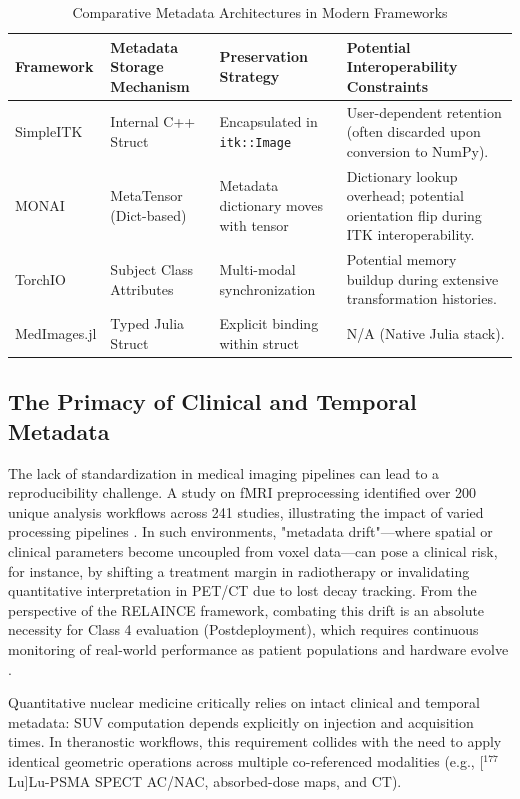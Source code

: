 \documentclass[10pt,letterpaper]{article}
\begin{document}
\begin{table}[H]
\centering
\caption{Comparative Metadata Architectures in Modern Frameworks}
\begin{tabular}{|p{2.5cm}|p{3.5cm}|p{3.5cm}|p{3.5cm}|}
\hline
\textbf{Framework} & \textbf{Metadata Storage Mechanism} & \textbf{Preservation Strategy} & \textbf{Potential Interoperability Constraints} \\
\hline
SimpleITK & Internal C++ Struct & Encapsulated in \texttt{itk::Image} & User-dependent retention (often discarded upon conversion to NumPy). \\
\hline
MONAI & MetaTensor (Dict-based) & Metadata dictionary moves with tensor & Dictionary lookup overhead; potential orientation flip during ITK interoperability. \\
\hline
TorchIO & Subject Class Attributes & Multi-modal synchronization & Potential memory buildup during extensive transformation histories. \\
\hline
MedImages.jl & Typed Julia Struct & Explicit binding within struct & N/A (Native Julia stack). \\
\hline
\end{tabular}
\label{tab:metadata_comparison}
\end{table}

\subsection*{The Primacy of Clinical and Temporal Metadata}
The lack of standardization in medical imaging pipelines can lead to a reproducibility challenge. A study on fMRI preprocessing identified over 200 unique analysis workflows across 241 studies, illustrating the impact of varied processing pipelines \cite{Esteban_2018}. In such environments, "metadata drift"---where spatial or clinical parameters become uncoupled from voxel data---can pose a clinical risk, for instance, by shifting a treatment margin in radiotherapy or invalidating quantitative interpretation in PET/CT due to lost decay tracking. From the perspective of the RELAINCE framework, combating this drift is an absolute necessity for Class 4 evaluation (Postdeployment), which requires continuous monitoring of real-world performance as patient populations and hardware evolve \cite{JhaBradshaw2022}.

Quantitative nuclear medicine critically relies on intact clinical and temporal metadata: SUV computation depends explicitly on injection and acquisition times. In theranostic workflows, this requirement collides with the need to apply identical geometric operations across multiple co-referenced modalities (e.g., [$^{177}$Lu]Lu-PSMA SPECT AC/NAC, absorbed-dose maps, and CT).
\end{document}
